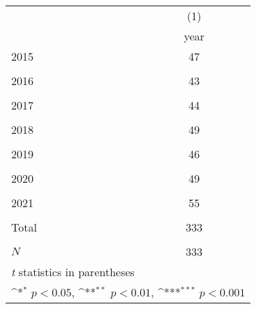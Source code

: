{
\def\sym#1{\ifmmode^{#1}\else\(^{#1}\)\fi}
\begin{tabular}{l*{1}{c}}
\hline\hline
            &\multicolumn{1}{c}{(1)}\\
            &\multicolumn{1}{c}{year}\\
\hline
2015        &          47         \\
            &                     \\
2016        &          43         \\
            &                     \\
2017        &          44         \\
            &                     \\
2018        &          49         \\
            &                     \\
2019        &          46         \\
            &                     \\
2020        &          49         \\
            &                     \\
2021        &          55         \\
            &                     \\
Total       &         333         \\
            &                     \\
\hline
\(N\)       &         333         \\
\hline\hline
\multicolumn{2}{l}{\footnotesize \textit{t} statistics in parentheses}\\
\multicolumn{2}{l}{\footnotesize \sym{*} \(p<0.05\), \sym{**} \(p<0.01\), \sym{***} \(p<0.001\)}\\
\end{tabular}
}

